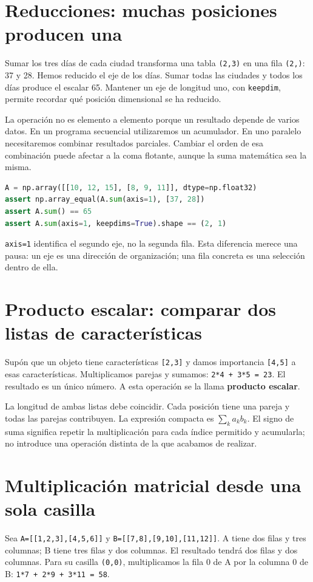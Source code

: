 \documentclass[12pt,a4paper,oneside]{report}
\begin{document}
\section{Reducciones: muchas posiciones producen una}
Sumar los tres días de cada ciudad transforma una tabla \texttt{(2,3)} en una fila \texttt{(2,)}: 37 y 28. Hemos reducido el eje de los días. Sumar todas las ciudades y todos los días produce el escalar 65. Mantener un eje de longitud uno, con \texttt{keepdim}, permite recordar qué posición dimensional se ha reducido.

La operación no es elemento a elemento porque un resultado depende de varios datos. En un programa secuencial utilizaremos un acumulador. En uno paralelo necesitaremos combinar resultados parciales. Cambiar el orden de esa combinación puede afectar a la coma flotante, aunque la suma matemática sea la misma.

\begin{lstlisting}[language=Python]
A = np.array([[10, 12, 15], [8, 9, 11]], dtype=np.float32)
assert np.array_equal(A.sum(axis=1), [37, 28])
assert A.sum() == 65
assert A.sum(axis=1, keepdims=True).shape == (2, 1)
\end{lstlisting}
\texttt{axis=1} identifica el segundo eje, no la segunda fila. Esta diferencia merece una pausa: un eje es una dirección de organización; una fila concreta es una selección dentro de ella.

\section{Producto escalar: comparar dos listas de características}
Supón que un objeto tiene características \texttt{[2,3]} y damos importancia \texttt{[4,5]} a esas características. Multiplicamos parejas y sumamos: \texttt{2*4 + 3*5 = 23}. El resultado es un único número. A esta operación se la llama \textbf{producto escalar}.

La longitud de ambas listas debe coincidir. Cada posición tiene una pareja y todas las parejas contribuyen. La expresión compacta es $\sum_k a_k b_k$. El signo de suma significa repetir la multiplicación para cada índice permitido y acumularla; no introduce una operación distinta de la que acabamos de realizar.

\section{Multiplicación matricial desde una sola casilla}
Sea \texttt{A=[[1,2,3],[4,5,6]]} y \texttt{B=[[7,8],[9,\allowbreak{}10],[11,12]]}. A tiene dos filas y tres columnas; B tiene tres filas y dos columnas. El resultado tendrá dos filas y dos columnas. Para su casilla \texttt{(0,0)}, multiplicamos la fila 0 de A por la columna 0 de B: \texttt{1*7 + 2*9 + \allowbreak{}3*11 = 58}.
\end{document}
